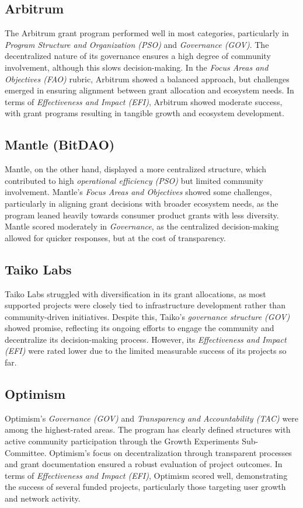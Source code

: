 \documentclass[a4,10pt]{article}
\begin{document}
\subsection{Arbitrum}\label{sec_8.1}
The Arbitrum grant program performed well in most categories, particularly in \textit{Program Structure and Organization (PSO)} and \textit{Governance (GOV)}. The decentralized nature of its governance ensures a high degree of community involvement, although this slows decision-making. In the \textit{Focus Areas and Objectives (FAO)} rubric, Arbitrum showed a balanced approach, but challenges emerged in ensuring alignment between grant allocation and ecosystem needs. In terms of \textit{Effectiveness and Impact (EFI)}, Arbitrum showed moderate success, with grant programs resulting in tangible growth and ecosystem development.

\subsection{Mantle (BitDAO)}\label{sec_8.2}
Mantle, on the other hand, displayed a more centralized structure, which contributed to high \textit{operational efficiency (PSO)} but limited community involvement. Mantle’s \textit{Focus Areas and Objectives} showed some challenges, particularly in aligning grant decisions with broader ecosystem needs, as the program leaned heavily towards consumer product grants with less diversity. Mantle scored moderately in \textit{Governance}, as the centralized decision-making allowed for quicker responses, but at the cost of transparency.

\subsection{Taiko Labs}\label{sec_8.3}
Taiko Labs struggled with diversification in its grant allocations, as most supported projects were closely tied to infrastructure development rather than community-driven initiatives. Despite this, Taiko’s \textit{governance structure (GOV)} showed promise, reflecting its ongoing efforts to engage the community and decentralize its decision-making process. However, its \textit{Effectiveness and Impact (EFI)} were rated lower due to the limited measurable success of its projects so far.

\subsection{Optimism}\label{sec_8.4}
Optimism’s \textit{Governance (GOV)} and \textit{Transparency and Accountability (TAC)} were among the highest-rated areas. The program has clearly defined structures with active community participation through the Growth Experiments Sub-Committee. Optimism’s focus on decentralization through transparent processes and grant documentation ensured a robust evaluation of project outcomes. In terms of \textit{Effectiveness and Impact (EFI)}, Optimism scored well, demonstrating the success of several funded projects, particularly those targeting user growth and network activity.
\end{document}
